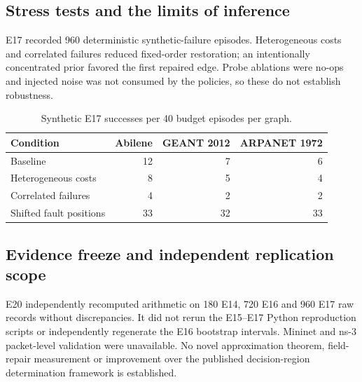 \subsection{Stress tests and the limits of inference}
E17 recorded 960 deterministic synthetic-failure episodes. Heterogeneous costs and correlated failures reduced fixed-order restoration; an intentionally concentrated prior favored the first repaired edge. Probe ablations were no-ops and injected noise was not consumed by the policies, so these do not establish robustness.
\begin{table}[H]\centering\small
\caption{Synthetic E17 successes per 40 budget episodes per graph.}\label{tab:e21-stress}
\begin{tabular}{lrrr}\toprule
Condition & Abilene & GEANT 2012 & ARPANET 1972\\\midrule
Baseline & 12 & 7 & 6\\
Heterogeneous costs & 8 & 5 & 4\\
Correlated failures & 4 & 2 & 2\\
Shifted fault positions & 33 & 32 & 33\\\bottomrule
\end{tabular}
\end{table}

\subsection{Evidence freeze and independent replication scope}
E20 independently recomputed arithmetic on 180 E14, 720 E16 and 960 E17 raw records without discrepancies. It did not rerun the E15--E17 Python reproduction scripts or independently regenerate the E16 bootstrap intervals. Mininet and ns-3 packet-level validation were unavailable. No novel approximation theorem, field-repair measurement or improvement over the published decision-region determination framework \citep{Javdani2014} is established.
